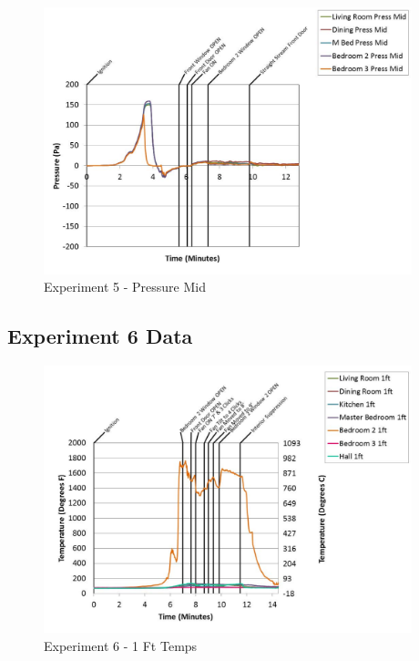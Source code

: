 \documentclass{article}
\begin{document}
\begin{appendices}
	\clearpage

	\begin{figure}[h!]
		\centering
		\includegraphics[height=3.05in]{0_Images/Results_Charts/Exp_5_Charts/PressureMid.pdf}
		\caption{Experiment 5 - Pressure Mid}
	\end{figure}
 

		\clearpage
\clearpage		\large
\subsection{Experiment 6 Data} \label{App:Exp6Results} 

	\begin{figure}[h!]
		\centering
		\includegraphics[height=3.05in]{0_Images/Results_Charts/Exp_6_Charts/1FtTemps.pdf}
		\caption{Experiment 6 - 1 Ft Temps}
	\end{figure}
 


\end{appendices}
\end{document}
